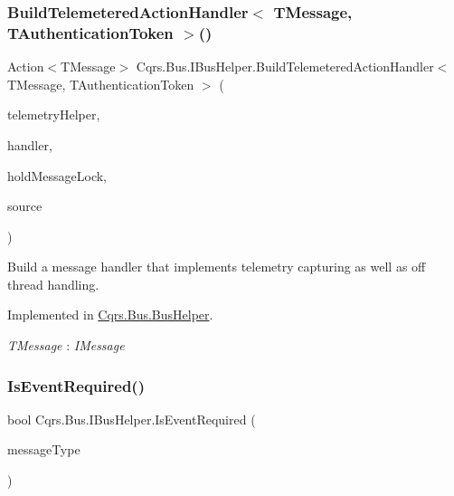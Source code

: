 \subsubsection{\texorpdfstring{Build\+Telemetered\+Action\+Handler$<$ T\+Message, T\+Authentication\+Token $>$()}{BuildTelemeteredActionHandler< TMessage, TAuthenticationToken >()}}
{\footnotesize\ttfamily Action$<$T\+Message$>$ Cqrs.\+Bus.\+I\+Bus\+Helper.\+Build\+Telemetered\+Action\+Handler$<$ T\+Message, T\+Authentication\+Token $>$ (\begin{DoxyParamCaption}\item[{I\+Telemetry\+Helper}]{telemetry\+Helper,  }\item[{Action$<$ T\+Message $>$}]{handler,  }\item[{bool}]{hold\+Message\+Lock,  }\item[{string}]{source }\end{DoxyParamCaption})}



Build a message handler that implements telemetry capturing as well as off thread handling. 



Implemented in \hyperlink{classCqrs_1_1Bus_1_1BusHelper_a7edd5b2ac0d46ce225e592f857f6d525}{Cqrs.\+Bus.\+Bus\+Helper}.

\begin{Desc}
\item[Type Constraints]\begin{description}
\item[{\em T\+Message} : {\em I\+Message}]\end{description}
\end{Desc}
\mbox{\label{interfaceCqrs_1_1Bus_1_1IBusHelper_acddf7635d6de08e3b09d552361fe4fda}} 
\subsubsection{\texorpdfstring{Is\+Event\+Required()}{IsEventRequired()}\hspace{0.1cm}{\footnotesize\ttfamily [1/2]}}
{\footnotesize\ttfamily bool Cqrs.\+Bus.\+I\+Bus\+Helper.\+Is\+Event\+Required (\begin{DoxyParamCaption}\item[{Type}]{message\+Type }\end{DoxyParamCaption})}



